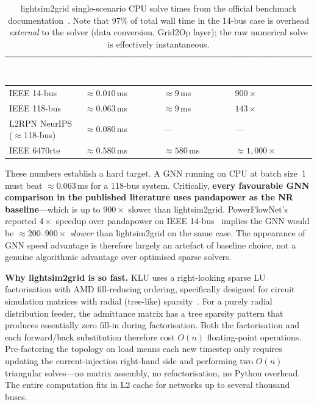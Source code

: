 \documentclass[11pt]{article}
\begin{document}
\begin{table}[ht]
\centering
\renewcommand{\arraystretch}{1.25}
\begin{tabular}{
  >{\raggedright\arraybackslash}p{4.5cm}
  >{\centering\arraybackslash}p{2.8cm}
  >{\centering\arraybackslash}p{2.8cm}
  >{\centering\arraybackslash}p{3.2cm}
}
\toprule
\rowcolor{headerblue}
\textcolor{white}{\textbf{System}}
  & \textcolor{white}{\textbf{lightsim2grid (KLU)}}
  & \textcolor{white}{\textbf{pandapower (NR)}}
  & \textcolor{white}{\textbf{lightsim2grid speedup}} \\
\midrule
\rowcolor{rowblue}
IEEE 14-bus   & $\approx 0.010$\,ms & $\approx 9$\,ms   & $900\times$  \\
IEEE 118-bus  & $\approx 0.063$\,ms & $\approx 9$\,ms   & $143\times$  \\
\rowcolor{rowblue}
L2RPN NeurIPS ($\approx$118-bus) & $\approx 0.080$\,ms & --- & --- \\
IEEE 6470rte  & $\approx 0.580$\,ms & $\approx 580$\,ms & ${\approx}1{,}000\times$ \\
\bottomrule
\end{tabular}
\caption{lightsim2grid single-scenario CPU solve times from the official
  benchmark documentation~\cite{lightsim2grid}.  Note that 97\% of total
  wall time in the 14-bus case is overhead \emph{external} to the solver
  (data conversion, Grid2Op layer); the raw numerical solve is
  effectively instantaneous.}
\label{tab:lightsim}
\end{table}

These numbers establish a hard target.  A GNN running on CPU at batch
size~1 must beat ${\approx}0.063$\,ms for a 118-bus system.
Critically, \textbf{every favourable GNN comparison in the published
literature uses pandapower as the NR baseline}---which is up to $900\times$
slower than lightsim2grid.  PowerFlowNet's reported $4\times$ speedup over
pandapower on IEEE 14-bus~\cite{Lin2024} implies the GNN would be
${\approx}200$--$900\times$ \emph{slower} than lightsim2grid on the same
case.  The appearance of GNN speed advantage is therefore largely an
artefact of baseline choice, not a genuine algorithmic advantage over
optimised sparse solvers.

\medskip
\noindent\textbf{Why lightsim2grid is so fast.}
KLU uses a right-looking sparse LU factorisation with AMD fill-reducing
ordering, specifically designed for circuit simulation matrices with
radial (tree-like) sparsity~\cite{Davis2010}.  For a purely radial
distribution feeder, the admittance matrix has a tree sparsity pattern
that produces essentially zero fill-in during factorisation.  Both the
factorisation and each forward/back substitution therefore cost $O(n)$
floating-point operations.  Pre-factoring the topology on load means each
new timestep only requires updating the current-injection right-hand side
and performing two $O(n)$ triangular solves---no matrix assembly, no
refactorisation, no Python overhead.  The entire computation fits in L2
cache for networks up to several thousand buses.
\end{document}
